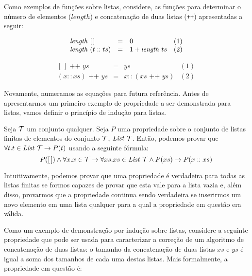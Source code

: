 Como exemplos de funções sobre listas, considere, as funções para
determinar o número de elementos ($length$) e concatenação de duas
listas (\texttt{++}) apresentadas a seguir:

\[
\begin{array}{lclr}
  \textit{length\/}\,\,[\,] & = & 0 & (1)\\
  \textit{length\/}\,\,(t :: ts) & = & 1 + \textit{length\/}\,\, ts & (2)\\
\end{array}
\]

 \[
  \begin{array}{lclr}
    [\,] \text { ++ } ys & = & ys & (1)\\
    (x :: xs) \text{ ++ }  ys & = & x :: (xs\text{ ++ } ys) & (2)
  \end{array}
  \]

Novamente, numeramos as equações para futura referência. Antes de
apresentarmos um primeiro exemplo de propriedade a ser demonstrada
para listas, vamos definir o princípio de indução para listas.

\begin{Definition}
Seja $\mathcal{T}$ um conjunto qualquer. Seja $P$ uma propriedade sobre o
conjunto de listas finitas de elementos do conjunto $\mathcal{T}$,
$\textit{List\/}\,\,\mathcal{T}$. Então, podemos provar que $\forall
t. t\in\textit{List\/}\,\,\mathcal{T}\to P(t)$ usando a seguinte fórmula:
\[
P([\,])\land\forall x. x\in \mathcal{T} \to \forall xs. xs \in \textit{List\/}\,\,\mathcal{T} \land
P(xs) \to P(x :: xs)
\]
\end{Definition}
Intuitivamente, podemos provar que uma propriedade é verdadeira para
todas as listas finitas se formos capazes de provar que esta vale para
a lista vazia e, além disso,  provarmos que a propriedade continua
sendo verdadeira se inserirmos um novo elemento em uma lista qualquer
para a qual a propriedade em questão era válida.

Como um exemplo de demonstração por indução sobre listas,
considere a seguinte propriedade que pode ser usada para caracterizar
a correção de um algoritmo de concatenação de duas listas: o tamanho
da concatenação de duas listas $xs$ e $ys$ é igual a soma dos tamanhos
de cada uma destas listas. Mais formalmente, a propriedade em questão é:

